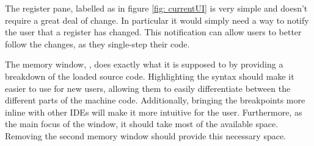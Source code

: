 The register pane, labelled as  in figure \ref{fig: currentUI} is very simple and doesn't require a great deal of change. In particular it would simply need a way to notify the user that a register has changed. This notification can allow users to better follow the changes, as they single-step their code.

The memory window, , does exactly what it is supposed to by providing a breakdown of the loaded source code. Highlighting the syntax should make it easier to use for new users, allowing them to easily differentiate between the different parts of the machine code. Additionally, bringing the breakpoints more inline with other IDEs will make it more intuitive for the user. Furthermore, as the main focus of the window, it should take most of the available space. Removing the second memory window should provide this necessary space.

